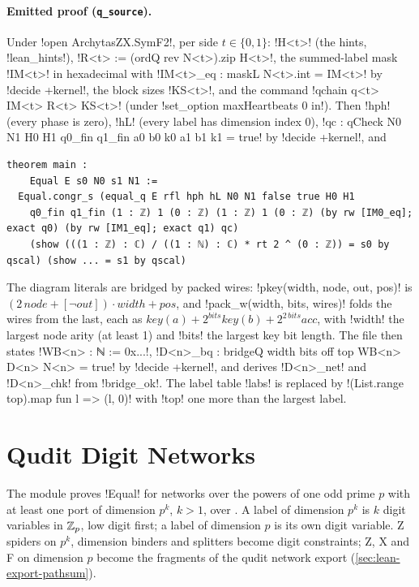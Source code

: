 {{{\paragraph{Emitted proof (\texttt{q\_source}).} Under \lexlean!open ArchytasZX.SymF2!, per side
$t\in\{0,1\}$: \lexlean!H<t>! (the hints, \lexpy!lean_hints!), \lexlean!R<t> := (ordQ rev N<t>).zip H<t>!,
the summed-label mask \lexlean!IM<t>! in hexadecimal with \lexlean!IM<t>_eq : maskL N<t>.int = IM<t>!
by \lexlean!decide +kernel!, the block sizes \lexlean!KS<t>!, and the command
\lexlean!qchain q<t> IM<t> R<t> KS<t>! (under \lexcode!set_option maxHeartbeats 0 in!). Then
\lexlean!hph! (every phase is zero), \lexlean!hL! (every label has dimension index 0), \lexlean!qc : qCheck N0 N1 H0 H1 q0_fin q1_fin a0 b0 k0 a1 b1 k1 = true! by \lexlean!decide +kernel!, and
\begin{lstlisting}[style=lexlean]
theorem main :
    Equal E s0 N0 s1 N1 :=
  Equal.congr_s (equal_q E rfl hph hL N0 N1 false true H0 H1
    q0_fin q1_fin (1 : ℤ) 1 (0 : ℤ) (1 : ℤ) 1 (0 : ℤ) (by rw [IM0_eq]; exact q0) (by rw [IM1_eq]; exact q1) qc)
    (show (((1 : ℤ) : ℂ) / ((1 : ℕ) : ℂ) * rt 2 ^ (0 : ℤ)) = s0 by qscal) (show ... = s1 by qscal)
\end{lstlisting}
The diagram literals are bridged by packed wires: \lexpy!pkey(width, node, out, pos)! is
$(2\,\mathit{node} + [\lnot\mathit{out}])\cdot\mathit{width} + \mathit{pos}$, and
\lexpy!pack_w(width, bits, wires)! folds the wires from the last, each as
$\mathit{key}(a) + 2^{\mathit{bits}}\mathit{key}(b) + 2^{2\,\mathit{bits}}\mathit{acc}$, with
\lexcode!width! the largest node arity (at least 1) and \lexcode!bits! the largest key bit length. The
file then states \lexlean!WB<n> : ℕ := 0x...!, \lexlean!D<n>_bq : bridgeQ width bits off top WB<n> D<n> N<n> = true! by \lexlean!decide +kernel!, and derives \lexlean!D<n>_net! and \lexlean!D<n>_chk! from
\lexlean!bridge_ok!. The label table \lexlean!labs! is replaced by
\lexlean!(List.range top).map fun l => (l, 0)! with \lexcode!top! one more than the largest label.

\section{Qudit Digit Networks}\label{sec:lean-export-qdigits}

The module  proves \lexlean!Equal! for networks over
the powers of one odd prime $p$ with at least one port of dimension $p^{k}$, $k>1$, over
. A label of dimension $p^{k}$ is $k$ digit
variables in $\mathbb{Z}_p$, low digit first; a label of dimension $p$ is its own digit variable. Z
spiders on $p^{k}$, dimension binders and splitters become digit constraints; Z, X and F on
dimension $p$ become the fragments of the qudit network export
(\cref{sec:lean-export-pathsum}).

}}}
